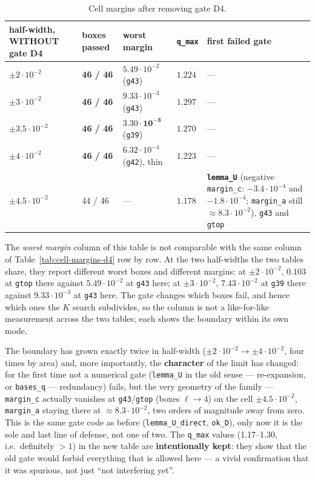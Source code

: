 \begin{table}[ht]
\centering
\caption{Cell margins after removing gate D4.}
\label{tab:cell-margins-nod4}
{\small\setlength{\tabcolsep}{4pt}
\begin{tabular}{>{\raggedright\arraybackslash}p{}lll>{\raggedright\arraybackslash}p{}}
\hline
half-width, WITHOUT gate D4 & boxes passed & worst margin & \texttt{q\_max} & first failed gate \\
\hline
$\pm 2\cdot 10^{-2}$ & \textbf{46 / 46} & $5.49\cdot 10^{-2}$ (\texttt{g43}) & $1.224$ & --- \\
$\pm 3\cdot 10^{-2}$ & \textbf{46 / 46} & $9.33\cdot 10^{-3}$ (\texttt{g43}) & $1.297$ & --- \\
$\pm 3.5\cdot 10^{-2}$ & \textbf{46 / 46} & $\mathbf{3.30\cdot 10^{-3}}$ (\texttt{g39}) & $1.270$ & --- \\
$\pm 4\cdot 10^{-2}$ & \textbf{46 / 46} & $6.32\cdot 10^{-4}$ (\texttt{g42}), thin & $1.223$ & --- \\
$\pm 4.5\cdot 10^{-2}$ & 44 / 46 & --- & $1.178$ & \textbf{\texttt{lemma\_U}} (negative \texttt{margin\_c}: $-3.4\cdot 10^{-4}$ and $-1.8\cdot 10^{-4}$; \texttt{margin\_a} still $\approx 8.3\cdot 10^{-2}$), \texttt{g43} and \texttt{gtop} \\
\hline
\end{tabular}}
\end{table}

\noindent The \emph{worst margin} column of this table is not comparable with
the same column of Table~\ref{tab:cell-margins-d4} row by row. At the two
half-widths the two tables share, they report different worst boxes and
different margins: at $\pm 2\cdot 10^{-2}$, $0.103$ at \texttt{gtop} there
against $5.49\cdot 10^{-2}$ at \texttt{g43} here; at $\pm 3\cdot 10^{-2}$,
$7.43\cdot 10^{-2}$ at \texttt{g39} there against $9.33\cdot 10^{-3}$ at
\texttt{g43} here. The gate changes which boxes fail, and hence which ones the
$K$ search subdivides, so the column is not a like-for-like measurement across
the two tables; each shows the boundary within its own mode.

The boundary has grown exactly twice in half-width ($\pm 2\cdot 10^{-2}\to\pm 4\cdot 10^{-2}$, four
times by area) and, more importantly, the \textbf{character} of the limit has
changed: for the first time not a numerical gate (\texttt{lemma\_U} in the old sense
--- re-expansion, or \texttt{bases\_q} --- redundancy) fails, but the very geometry of
the family --- \texttt{margin\_c} actually vanishes at \texttt{g43}/\texttt{gtop} (boxes
$\ell \to 4$) on the cell $\pm 4.5\cdot 10^{-2}$, \texttt{margin\_a} staying there
at $\approx 8.3\cdot 10^{-2}$, two orders of magnitude away from zero. This is the same gate code as before
(\texttt{lemma\_\allowbreak U\_\allowbreak direct}, \texttt{ok\_D}), only now it is the sole and last line of defense,
not one of two. The \texttt{q\_max} values (1.17--1.30, i.e.\ definitely $>1$) in the
new table are \textbf{intentionally kept}: they show that the old gate would
forbid everything that is allowed here --- a vivid confirmation that it was
spurious, not just ``not interfering yet''.

